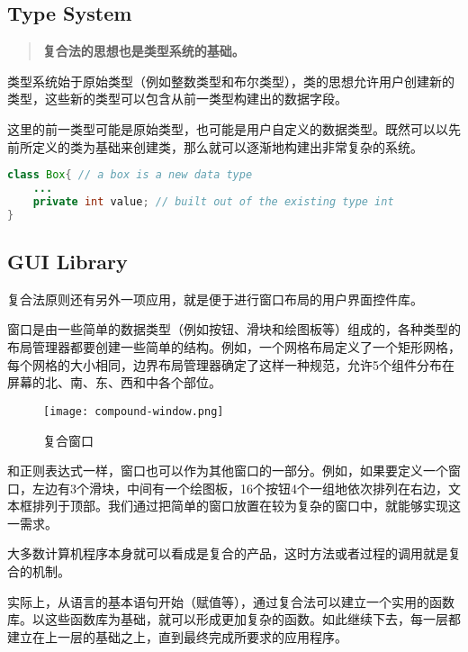 \subsection{Type System}


\begin{quote}
\textbf{复合法的思想也是类型系统的基础。}
\end{quote}

类型系统始于原始类型（例如整数类型和布尔类型），类的思想允许用户创建新的类型，这些新的类型可以包含从前一类型构建出的数据字段。

这里的前一类型可能是原始类型，也可能是用户自定义的数据类型。既然可以以先前所定义的类为基础来创建类，那么就可以逐渐地构建出非常复杂的系统。


\begin{lstlisting}[language=Java]
class Box{ // a box is a new data type
	...
	private int value; // built out of the existing type int
}
\end{lstlisting}



\subsection{GUI Library}

复合法原则还有另外一项应用，就是便于进行窗口布局的用户界面控件库。

窗口是由一些简单的数据类型（例如按钮、滑块和绘图板等）组成的，各种类型的布局管理器都要创建一些简单的结构。例如，一个网格布局定义了一个矩形网格，每个网格的大小相同，边界布局管理器确定了这样一种规范，允许5个组件分布在屏幕的北、南、东、西和中各个部位。

\begin{figure}[htbp]
\centering
\texttt{[image: compound-window.png]}
\caption{复合窗口}
\label{fig:compound-window}
\end{figure}

和正则表达式一样，窗口也可以作为其他窗口的一部分。例如，如果要定义一个窗口，左边有3个滑块，中间有一个绘图板，16个按钮4个一组地依次排列在右边，文本框排列于顶部。我们通过把简单的窗口放置在较为复杂的窗口中，就能够实现这一需求。




大多数计算机程序本身就可以看成是复合的产品，这时方法或者过程的调用就是复合的机制。

实际上，从语言的基本语句开始（赋值等），通过复合法可以建立一个实用的函数库。以这些函数库为基础，就可以形成更加复杂的函数。如此继续下去，每一层都建立在上一层的基础之上，直到最终完成所要求的应用程序。

